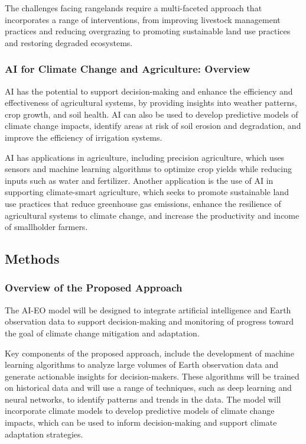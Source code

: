\documentclass[draft, {\secondLanguage}, english]{volcanica-template}
\begin{document}
The challenges facing rangelands require a multi-faceted approach that incorporates a range of interventions, from improving livestock management practices and reducing overgrazing to promoting sustainable land use practices and restoring degraded ecosystems. 

\subsubsection{AI for Climate Change and Agriculture: Overview}\label{sec:02bb}
AI has the potential to support decision-making and enhance the efficiency and effectiveness of agricultural systems, by providing insights into weather patterns, crop growth, and soil health. AI can also be used to develop predictive models of climate change impacts, identify areas at risk of soil erosion and degradation, and improve the efficiency of irrigation systems.

AI has applications in agriculture, including precision agriculture, which uses sensors and machine learning algorithms to optimize crop yields while reducing inputs such as water and fertilizer. Another application is the use of AI in supporting climate-smart agriculture, which seeks to promote sustainable land use practices that reduce greenhouse gas emissions, enhance the resilience of agricultural systems to climate change, and increase the productivity and income of smallholder farmers.

\subsection{Methods}\label{sec:02c}
\subsubsection{Overview of the Proposed Approach}\label{sec:02ca}
The AI-EO model will be designed to integrate artificial intelligence and Earth observation data to support decision-making and monitoring of progress toward the goal of climate change mitigation and adaptation. 

Key components of the proposed approach, include the development of machine learning algorithms to analyze large volumes of Earth observation data and generate actionable insights for decision-makers. These algorithms will be trained on historical data and will use a range of techniques, such as deep learning and neural networks, to identify patterns and trends in the data. The model will incorporate climate models to develop predictive models of climate change impacts, which can be used to inform decision-making and support climate adaptation strategies.
\end{document}
